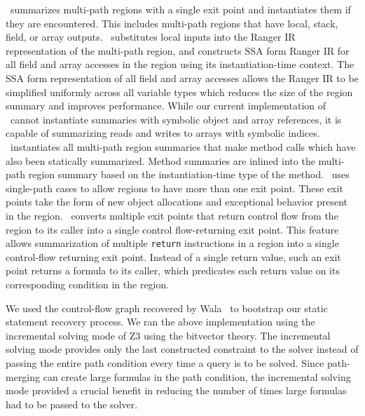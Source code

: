 \tool\ summarizes multi-path regions with a single exit point and instantiates them if they are encountered.
This includes multi-path regions that have local, stack, field, or array outputs.
%
\tool\ substitutes local inputs into the Ranger IR representation of the multi-path region, and constructs SSA form
Ranger IR for all field and array accesses in the region using its instantiation-time context.
%
The SSA form representation of all field and array accesses allows the Ranger IR to be simplified uniformly across all
variable types which reduces the size of the region summary and improves performance.
%
While our current implementation of \tool\ cannot instantiate summaries with symbolic object and array
references, it is capable of summarizing reads and writes to arrays with symbolic indices.
%
\tool\ instantiates all multi-path region
summaries that make method calls which have also been statically summarized.
%
Method summaries are inlined into
the multi-path region summary based on the instantiation-time type of the method.
%
\tool\ uses single-path cases to allow regions to have more than one exit point.
%
These exit points take the form of new object allocations and exceptional behavior present in the region.
%
\tool\ converts multiple exit points that return
control flow from the region to its caller into a single control flow-returning exit point.
%
This feature allows summarization of multiple {\tt return} instructions in a region into a single control-flow
returning exit point.
%
Instead of a single return value, such an exit point returns a formula to its caller, which predicates
each return value on its corresponding condition in the region.

We used the control-flow graph recovered by Wala~\cite{Wala} to bootstrap our static statement recovery process.
%
%
%
We ran the above implementation using the incremental solving mode of Z3 using the bitvector theory.
%
The incremental solving mode provides only the last constructed constraint to the solver instead of passing the entire
path condition every time a query is to be solved.
%
Since path-merging can create large formulas in the path condition, the incremental solving mode provided a crucial
benefit in reducing the number of times large formulas had to be passed to the solver.
%
